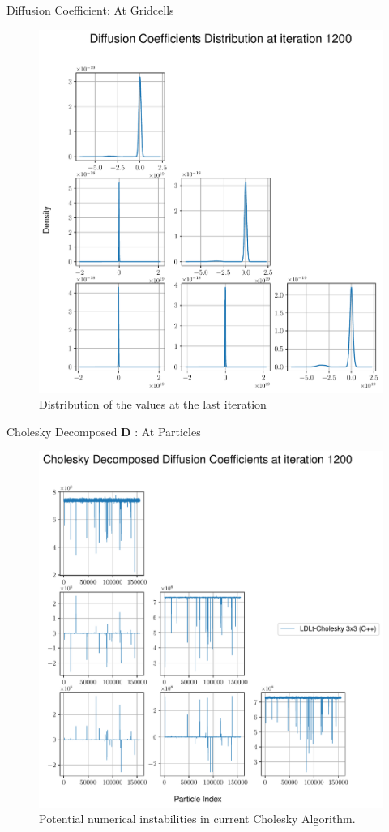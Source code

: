 \begin{frame}[c]{Diffusion Coefficient: At Gridcells}
\begin{multicols}{2}
\begin{figure}[!htb]
      \includegraphics[width=1.05\linewidth]{figures/D_distribution.pdf}
      \caption{Distribution of the values at the last iteration}
      \label{fig:Fd_asymptotic_behavior_reference}
    \end{figure}
    \end{multicols}
\end{frame}

\begin{frame}[c]{Cholesky Decomposed $\boldsymbol D$ : At Particles}
    \begin{figure}[!htb]
        \centering
        \captionsetup{justification=centering}
      \includegraphics[width=0.65\linewidth]{figures/Q_distribution.pdf}
      \caption{Potential numerical instabilities in current Cholesky Algorithm.}
      \label{fig:Fd_asymptotic_behavior_2nd}
    \end{figure}
\end{frame}


